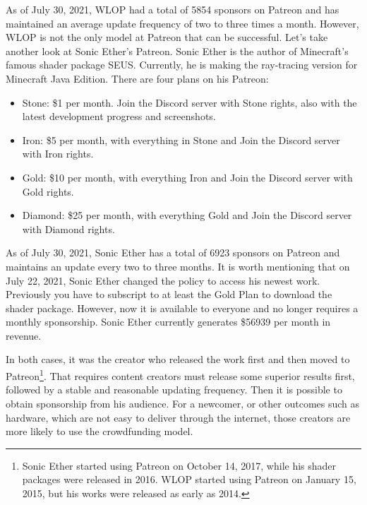 \documentclass[12pt,a4paper]{article}
\begin{document}
    As of July 30, 2021, WLOP had a total of 5854 sponsors on Patreon and has
    maintained an average update frequency of two to three times a month.
    However, WLOP is not the only model at Patreon that can be successful.
    Let's take another look at Sonic Ether's Patreon.
    Sonic Ether is the author of Minecraft's famous shader package SEUS.
    Currently, he is making the ray-tracing version for Minecraft Java Edition.
    There are four plans on his Patreon\cite{seus_patreon}:
    \begin{itemize}
        \item Stone: \$1 per month. Join the Discord server with Stone rights,
        also with the latest development progress and screenshots.
        \item Iron: \$5 per month, with everything in Stone and Join the Discord
        server with Iron rights.
        \item Gold: \$10 per month, with everything Iron and Join the Discord
        server with Gold rights.
        \item Diamond: \$25 per month, with everything Gold and Join the Discord
        server with Diamond rights.
    \end{itemize}

    As of July 30, 2021, Sonic Ether has a total of 6923 sponsors on Patreon and
    maintains an update every two to three months.
    It is worth mentioning that on July 22, 2021, Sonic Ether changed the policy
    to access his newest work.
    Previously you have to subscript to at least the Gold Plan to download the
    shader package.
    However, now it is available to everyone and no longer requires a monthly
    sponsorship.
    Sonic Ether currently generates \$56939 per month in revenue.

    In both cases, it was the creator who released the work first and then moved
    to Patreon\footnote{
        Sonic Ether started using Patreon on October 14, 2017,
        while his shader packages were released in 2016.
        WLOP started using Patreon on January 15, 2015,
        but his works were released as early as 2014.
    }.
    That requires content creators must release some superior results first,
    followed by a stable and reasonable updating frequency.
    Then it is possible to obtain sponsorship from his audience.
    For a newcomer, or other outcomes such as hardware, which are not easy to
    deliver through the internet, those creators are more likely to use the
    crowdfunding model.
\end{document}
